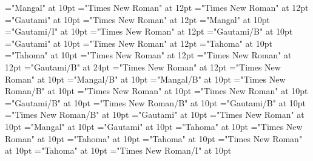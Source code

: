 \documentclass[a4paper]{article}
\begin{document}
\pagestyle{plain}
\sloppy
\setlength{\parfillskip}{0pt plus 1fil}
\font\xitemhi="Mangal" at 10pt
\font\xitemxitemcomplexformcomponentsbefore="Times New Roman" at 12pt
\font\xitemxitemcomplexformentrytypebefore="Times New Roman" at 12pt
\font\xitemxitemcomplexformrefheadwordbefore="Gautami" at 10pt
\font\xitemxitemcomplexformrefsbefore="Times New Roman" at 12pt
\font\xitemxitemdefinitionLebefore="Mangal" at 10pt
\font\xitemxitemexamplebefore="Gautami/I" at 10pt
\font\xitemxitemexamplesbefore="Times New Roman" at 12pt
\font\xitemxitemmainentryrefbefore="Gautami/B" at 10pt
\font\xitemxitemmorphformbefore="Gautami" at 10pt
\font\xitemxitemprimaryrefsbefore="Times New Roman" at 12pt
\font\xitemxitempronunciationformbefore="Tahoma" at 10pt
\font\xitemxitempronunciationsbefore="Tahoma" at 10pt
\font\sensesensesensesbefore="Times New Roman" at 12pt
\font{}="Times New Roman" at 12pt
\font{}="Gautami/B" at 24pt
\font{}="Times New Roman" at 12pt
\font\entryletDatadicBody="Times New Roman" at 10pt
\font\reversalformLehientryletDatadicBody="Mangal/B" at 10pt
\font\spanhireversalformLehientryletDatadicBody="Mangal/B" at 10pt
\font\spanenreversalformLehientryletDatadicBody="Times New Roman/B" at 10pt
\font\sensesentryletDatadicBody="Times New Roman" at 10pt
\font\spanensensesentryletDatadicBody="Times New Roman" at 10pt
\font\headrefggoTeluINsensesentryletDatadicBody="Gautami/B" at 10pt
\font\revsensenumberenheadrefggoTeluINsensesentryletDatadicBody="Times New Roman/B" at 10pt
\font\revsensenumberggoTeluINheadrefggoTeluINsensesentryletDatadicBody="Gautami/B" at 10pt
\font\SenseReferenceNumberenheadrefggoTeluINsensesentryletDatadicBody="Times New Roman/B" at 10pt
\font\morphformggoTeluINsensesentryletDatadicBody="Gautami" at 10pt
\font\spanenmorphformggoTeluINsensesentryletDatadicBody="Times New Roman" at 10pt
\font\xitemhimorphformggoTeluINsensesentryletDatadicBody="Mangal" at 10pt
\font\spanggoTeluINmorphformggoTeluINsensesentryletDatadicBody="Gautami" at 10pt
\font\pronunciationssensesentryletDatadicBody="Tahoma" at 10pt
\font\spanenpronunciationssensesentryletDatadicBody="Times New Roman" at 10pt
\font\pronunciationpronunciationssensesentryletDatadicBody="Tahoma" at 10pt
\font\pronunciationformggofonipaxemicpronunciationpronunciationssensesentryletDatadicBody="Tahoma" at 10pt
\font\spanenpronunciationformggofonipaxemicpronunciationpronunciationssensesentryletDatadicBody="Times New Roman" at 10pt
\font\spanggofonipaxemicpronunciationformggofonipaxemicpronunciationpronunciationssensesentryletDatadicBody="Tahoma" at 10pt
\font\grammaticalinfosensesentryletDatadicBody="Times New Roman/I" at 10pt
\end{document}
